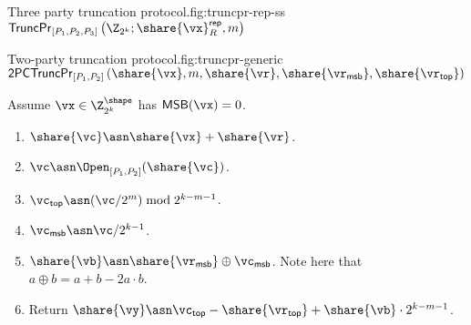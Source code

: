 \begin{Boxfig}{Three party truncation protocol.}{fig:truncpr-rep-ss}{$\mathsf{TruncPr}_{[P_1, P_2, P_3]} \left(\Z_{2^k}; \share{\vx}^{\mathsf{rep}}_{R}, m \right)$}
\begin{enumerate}
\end{enumerate}

\end{Boxfig}

\begin{Boxfig}{Two-party truncation protocol.}{fig:truncpr-generic}
  {$\mathsf{2PCTruncPr}_{[P_1, P_2]} \left( \share{\vx}, m, \share{\vr}, \share{\vr_{\mathsf{msb}}}, \share{\vr_{\mathsf{top}}} \right)$}

  Assume $\vx \in \Z_{2^k}^{\shape}$ has $\mathsf{MSB}(\vx) = 0$.
  \begin{enumerate}

  \item $\share{\vc} \asn \share{\vx} + \share{\vr}$.

  \item $\vc \asn \Open_{[P_1, P_2]}(\share{\vc})$.

  \item $\vc_{\mathsf{top}} \asn (\vc / 2^m) \bmod 2^{k-m-1}$.

  \item $\vc_{\mathsf{msb}} \asn \vc / 2^{k-1}$.

  \item $\share{\vb} \asn \share{\vr_{\mathsf{msb}}} \oplus \vc_{\mathsf{msb}}$. Note here that $a \oplus b = a + b - 2a\cdot b$.

  \item Return $\share{\vy} \asn \vc_{\mathsf{top}} - \share{\vr_{\mathsf{top}}} + \share{\vb} \cdot 2^{k-m-1}$.
\end{enumerate}

\end{Boxfig}


